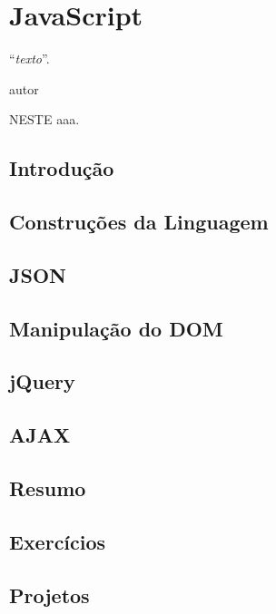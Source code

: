 \chapter{JavaScript}\label{cap:javaScript}
\epigraph{``\textit{texto}''.}{autor}

\lettrine[lines=4, lhang=0.1, lraise=0, loversize=0.2, findent=0.1em]{\textcolor{corAzulTema}{N}}{ESTE} aaa.

\section{Introdução}

\section{Construções da Linguagem}

\section{JSON}

\section{Manipulação do DOM}

\section{jQuery}

\section{AJAX}

\section{Resumo}

\section{Exercícios}

\section{Projetos}
